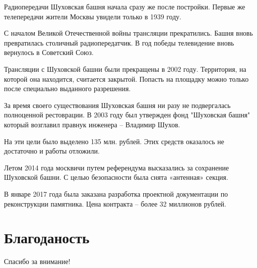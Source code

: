 \begin{frame}{}
	Радиопередачи Шуховская башня начала сразу же после постройки. Первые же телепередачи жители Москвы увидели только в 1939 году.

	С началом Великой Отечественной войны трансляции прекратились. Башня вновь превратилась столичный радиопередатчик. В год победы телевидение вновь вернулось в Советский Союз.
\end{frame}


\begin{frame}{}
	Трансляции с Шуховской башни были прекращены в 2002 году. Территория, на которой она находится, считается закрытой. Попасть на площадку можно только после специально выданного разрешения.
\end{frame}

\begin{frame}{}
	За время своего существования Шуховская башня ни разу не подвергалась полноценной рестоврации. В 2003 году был утвержден фонд "Шуховская башня" который возглавил правнук инженера -- Владимир Шухов.
\end{frame}


\begin{frame}{}
	На эти цели было выделено 135 млн. рублей. Этих средств оказалось не достаточно и работы отложили.

	Летом 2014 года москвичи путем референдума высказались за сохранение Шуховской башни. С целью безопасности была снята «антенная» секция.
\end{frame}


\begin{frame}{}
	В январе 2017 года была заказана разработка проектной документации по реконструкции памятника. Цена контракта – более 32 миллионов рублей.
\end{frame}


\section{Благоданость}
\begin{frame}
	\centering
	\huge
	Спасибо за внимание!
\end{frame}



